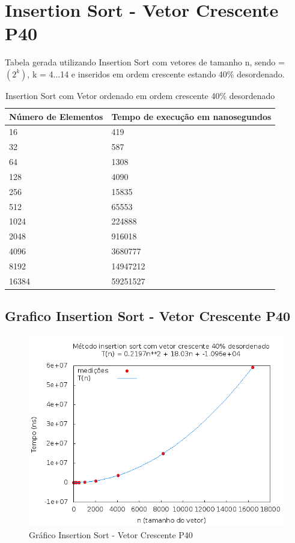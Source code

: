 \documentclass[12pt,a4paper,twoside]{report}
\begin{document}
\section{Insertion Sort - Vetor Crescente P40}
Tabela gerada utilizando Insertion Sort com vetores de tamanho n, sendo = $(2^k)$, k = 4...14 e inseridos em ordem crescente estando 40\% desordenado.

\begin{table}[H]
\centering
\caption{Insertion Sort com Vetor ordenado em ordem crescente 40\% desordenado}
\label{my-label}
\begin{tabular}{|l|l|}
\hline
\multicolumn{1}{|c|}{\textbf{Número de Elementos}} & \multicolumn{1}{c|}{\textbf{Tempo de execução em nanosegundos}} \\ \hline
16 & 419 \\ \hline
32 & 587 \\ \hline
64 & 1308 \\ \hline
128 & 4090 \\ \hline
256 & 15835 \\ \hline
512 & 65553 \\ \hline
1024 & 224888 \\ \hline
2048 & 916018 \\ \hline
4096 & 3680777 \\ \hline
8192 & 14947212 \\ \hline
16384 & 59251527 \\ \hline
\end{tabular}
\end{table}

\subsection{Grafico Insertion Sort - Vetor Crescente P40}
\begin{figure}[H]
    \centering
    \includegraphics[width=0.7\linewidth]{graficos/Insertion/vIntCrescenteP40/vIntCrescenteP40.png}
  \caption{Gráfico Insertion Sort - Vetor Crescente P40}
\end{figure}
\end{document}
